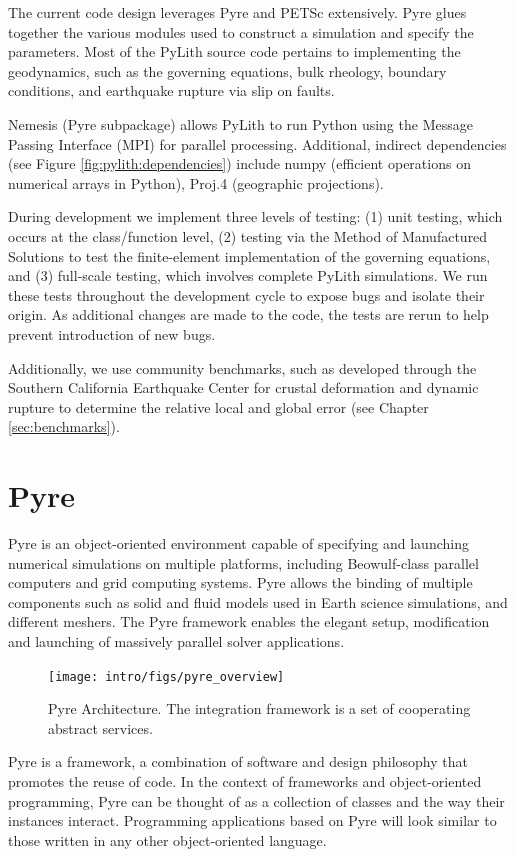 The current code design leverages Pyre and PETSc extensively. Pyre
glues together the various modules used to construct a simulation and
specify the parameters. Most of the PyLith source code pertains to
implementing the geodynamics, such as the governing equations, bulk
rheology, boundary conditions, and earthquake rupture via slip on
faults.

Nemesis (Pyre subpackage) allows PyLith to run Python using the
Message Passing Interface (MPI) for parallel processing. Additional,
indirect dependencies (see Figure \vref{fig:pylith:dependencies})
include numpy (efficient operations on numerical arrays in Python),
Proj.4 (geographic projections).

During development we implement three levels of testing: (1) unit
testing, which occurs at the class/function level, (2) testing via the
Method of Manufactured Solutions to test the finite-element
implementation of the governing equations, and (3) full-scale testing,
which involves complete PyLith simulations. We run these tests
throughout the development cycle to expose bugs and isolate their
origin. As additional changes are made to the code, the tests are
rerun to help prevent introduction of new bugs.

Additionally, we use community benchmarks, such as developed through
the Southern California Earthquake Center for crustal deformation and
dynamic rupture to determine the relative local and global error (see
Chapter \vref{sec:benchmarks}).

\section{Pyre}

Pyre is an object-oriented environment capable of specifying and launching
numerical simulations on multiple platforms, including Beowulf-class
parallel computers and grid computing systems. Pyre allows the binding
of multiple components such as solid and fluid models used in Earth
science simulations, and different meshers. The Pyre framework enables
the elegant setup, modification and launching of massively parallel
solver applications.

\begin{figure}[htbp]
  \texttt{[image: intro/figs/pyre\_overview]}
  \caption{Pyre Architecture. The integration framework is a set of
    cooperating abstract services.}
  \label{fig:Pyre:architecture}
\end{figure}

Pyre is a framework, a combination of software and design philosophy
that promotes the reuse of code. In the context of frameworks and
object-oriented programming, Pyre can be thought of as a collection of
classes and the way their instances interact.  Programming
applications based on Pyre will look similar to those written in any
other object-oriented language. 

